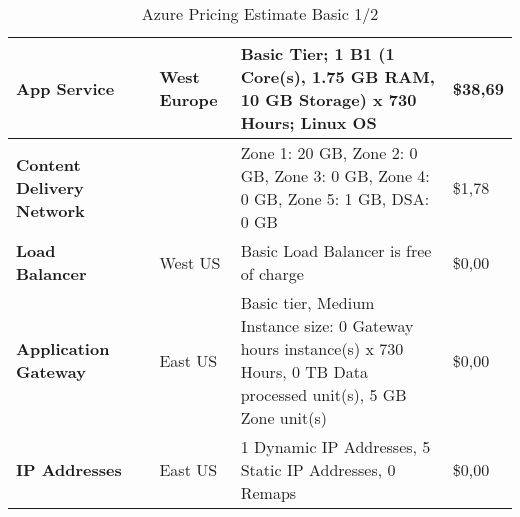 \begin{landscape}
\begin{table}[]
\begin{tabularx}{\linewidth}{|l|X|X|X|X|}
                \textbf{App Service}              &                           & West Europe     & Basic Tier; 1 B1 (1 Core(s), 1.75 GB RAM, 10 GB Storage) x 730 Hours; Linux OS                                                                                                                                                                   & \$38,69                                  \\ \hline
                \textbf{Content Delivery Network} &                           &                 & Zone 1: 20 GB, Zone 2: 0 GB, Zone 3: 0 GB, Zone 4: 0 GB, Zone 5: 1 GB, DSA: 0 GB                                                                                                                                                                 & \$1,78                                   \\ \hline
                \textbf{Load Balancer}            &                           & West US         & Basic Load Balancer is free of charge                                                                                                                                                                                                            & \$0,00                                   \\ \hline
                \textbf{Application Gateway}      &                           & East US         & Basic tier, Medium Instance size: 0 Gateway hours instance(s) x 730 Hours, 0 TB Data processed unit(s), 5 GB Zone unit(s)                                                                                                                        & \$0,00                                   \\ \hline
                \textbf{IP Addresses}             &                           & East US         & 1 Dynamic IP Addresses, 5 Static IP Addresses, 0 Remaps                                                                                                                                                                                          & \$0,00                                   \\ \hline
                \end{tabularx}
                \caption{Azure Pricing Estimate Basic 1/2}
                \label{azPriceT1_1}
        \end{table}
\end{landscape}